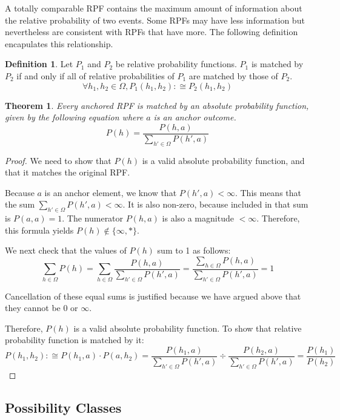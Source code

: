 \documentclass[twoside]{article}
\theoremstyle{plain}%
\newtheorem{theorem}{Theorem}[section]
\theoremstyle{definition}
\newtheorem{definition}{Definition}[section]
\theoremstyle{remark}
\begin{document}
A totally comparable RPF contains the maximum amount of information about the relative probability of two events. Some RPFs may have less information but nevertheless are consistent with RPFs that have more. The following definition encapulates this relationship.

\begin{definition}
Let \(P_1\) and \(P_2\) be relative probability functions. \(P_1\) is matched by \(P_2\) if and only if all of relative probabilities of \(P_1\) are matched by those of \(P_2\).
\[\forall h_1, h_2 \in \Omega, P_1(h_1, h_2) :\cong P_2(h_1, h_2)\]
\end{definition}

\begin{theorem}
\label{thm:absolute_prob_formula}
Every anchored RPF is matched by an absolute probability function, given by the following equation where \(a\) is an anchor outcome.
\[P(h) = \frac{P(h, a)}{\sum_{h' \in \Omega}P(h', a)}\]
\end{theorem}

\begin{proof}
We need to show that \(P(h)\) is a valid absolute probability function, and that it matches the original RPF.

Because \(a\) is an anchor element, we know that \(P(h', a) < \infty\). This means that the sum \(\sum_{h' \in \Omega}P(h', a) < \infty\). It is also non-zero, because included in that sum is \(P(a, a) = 1\). The numerator \(P(h, a)\) is also a magnitude \(< \infty\). Therefore, this formula yields \(P(h) \notin \{\infty, \ast\}\).

We next check that the values of \(P(h)\) sum to 1 as follows:
\[\sum_{h \in \Omega}P(h) = \sum_{h \in \Omega} \frac{P(h, a)}{\sum_{h' \in \Omega}P(h', a)} = \frac{\sum_{h \in \Omega}P(h, a)}{\sum_{h' \in \Omega}P(h', a)} = 1\]

Cancellation of these equal sums is justified because we have argued above that they cannot be \(0\) or \(\infty\).

Therefore, \(P(h)\) is a valid absolute probability function. To show that relative probability function is matched by it:
\begin{equation}
P(h_1, h_2) :\cong P(h_1, a) \cdot P(a, h_2) = \frac{P(h_1, a)}{\sum_{h' \in \Omega}P(h', a)} \div \frac{P(h_2, a)}{\sum_{h' \in \Omega}P(h', a)} = \frac{P(h_1)}{P(h_2)}
\end{equation}
\end{proof}

\subsection{Possibility Classes}
\end{document}
